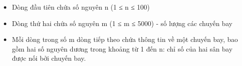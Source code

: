 \begin{itemize}
	\item     Dòng đầu tiên chứa số nguyên n (1 ≤ n ≤ 100)   
	\item     Dòng thứ hai chứa số nguyên m (1 ≤ m ≤ 5000) - số lượng các chuyến bay   
	\item     Mỗi dòng trong số m dòng tiếp theo chứa thông tin về một chuyến bay, bao gồm hai số nguyên dương trong khoảng từ 1 đến n: chỉ số của hai sân bay được nối bởi chuyến bay.   
\end{itemize}

\